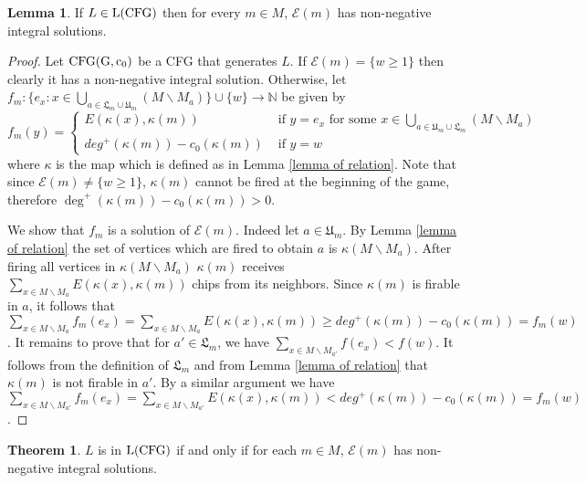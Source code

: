 \documentclass{article}
\theoremstyle{definition}
\newtheorem{lem}{Lemma}
\newtheorem{theo}{Theorem}
\newcommand\down[1]{e_{#1}}
\newcommand\set[1]{\{ #1 \}}
\begin{document}
\begin{lem}
\label{lemma of solution}
If $L \in {\rm L(CFG)}$ then for every $m \in M$,  $\mathcal{E}(m)$ has non-negative integral solutions. 
\end{lem}
\begin{proof}

Let ${\rm CFG(G,c_0)}$ be a CFG that generates $L$. If $\mathcal{E}(m)=\set{w \geq 1}$ then clearly it has a non-negative integral solution. Otherwise, let $ f_m: \set{\down{x}: x \in \underset{a\in \mathfrak{L}_m \cup \mathfrak{U}_m}{\bigcup} (M\backslash M_a)}\cup \set{w}\to \mathbb{N}$ be given by
 $$
f_m(y)=\begin{cases}
E(\kappa(x),\kappa(m))&\text{ if } y=\down{x} \text{ for some } x \in \underset{a \in \mathfrak{U}_m\cup \mathfrak{L}_m}{\bigcup} (M\backslash M_a) \\
deg^{+}(\kappa(m))-c_0(\kappa(m))&\text{ if } y=w
\end{cases}$$
where $\kappa$ is the map which is defined as in Lemma \ref{lemma of relation}. Note that since $\mathcal{E}(m)\neq \set{w\geq 1}$, $\kappa(m)$ cannot be fired at the beginning of the game, therefore $\deg^{+}(\kappa(m))-c_0(\kappa(m))>0$.

We show that $f_m$ is a solution of $\mathcal{E}(m)$. Indeed let $a\in \mathfrak{U}_m$. By Lemma \ref{lemma of relation} the set of vertices which are fired to obtain $a$ is $\kappa(M\backslash M_a)$. After firing all vertices in $\kappa(M\backslash M_a)$ $\kappa(m)$ receives $\underset{x\in M\backslash M_a}{\sum} E(\kappa(x),\kappa(m))$ chips from its neighbors. Since $\kappa(m)$ is firable in $a$, it follows that $\underset{x\in M\backslash M_a}{\sum} f_m(\down{x})= \underset{x\in M\backslash M_a}{\sum} E(\kappa(x),\kappa(m))\geq deg^{+}(\kappa(m))-c_0(\kappa(m))=f_m(w)$. It remains to prove that for $a'\in \mathfrak{L}_m$, we have $\underset{x\in M\backslash M_{a'}}{\sum}f(\down{x})<f(w)$. It follows from the definition of $\mathfrak{L}_m$ and from Lemma \ref{lemma of relation} that $\kappa(m)$ is not firable in $a'$. By a similar argument we have $\underset{x\in M\backslash M_{a'}}{\sum}f_m (\down{x})=\underset{x\in M\backslash M_{a'}}{\sum}E(\kappa(x),\kappa(m))<deg^{+}(\kappa(m))-c_0(\kappa(m))=f_m(w)$.
\end{proof}
\begin{theo}
\label{the condition of lattices induced by CFG}
$L$ is in ${\rm L(CFG)}$ if and only if for each $m \in M$, $\mathcal{E}(m)$ has non-negative integral solutions.
\end{theo}
\end{document}
